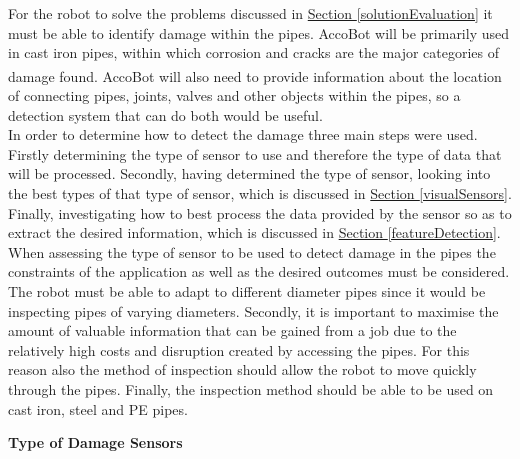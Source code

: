 \documentclass[11pt]{article}		%
\newcommand{\supercite}[1]{\textsuperscript{\cite{#1}}}		%
\newcommand{\sectref}[1]{\hyperref[#1]{Section \ref*{#1}}}     %
\begin{document}
	     For the robot to solve the problems discussed in \sectref{solutionEvaluation} it must be able to identify damage within the pipes.
	        AccoBot will be primarily used in cast iron pipes, within which corrosion and cracks are the major categories of damage found\supercite{Failure_pipes}\supercite{Failure_pipes2}.
	        AccoBot will also need to provide information about the location of connecting pipes, joints, valves and other objects within the pipes, so a detection system that can do both would be useful.
	        \\
            \hspace*{2ex}In order to determine how to detect the damage three main steps were used. 
	        Firstly determining the type of sensor to use and therefore the type of data that will be processed. 
	        Secondly, having determined the type of sensor, looking into the best types of that type of sensor, which is discussed in \sectref{visualSensors}.
	        Finally, investigating how to best process the data provided by the sensor so as to extract the desired information, which is discussed in \sectref{featureDetection}.
	       \\\hspace*{2ex}
	        When assessing the type of sensor to be used to detect damage in the pipes the constraints of the application as well as the desired outcomes must be considered.
            The robot must be able to adapt to different diameter pipes since it would be inspecting pipes of varying diameters.
	        Secondly, it is important to maximise the amount of valuable information that can be gained from a job due to the relatively high costs and disruption created by accessing the pipes.
	        For this reason also the method of inspection should allow the robot to move quickly through the pipes. 
	        Finally, the inspection method should be able to be used on cast iron, steel and PE pipes. 
	
	   \textbf{Type of Damage Sensors}\label{damagesensors}
	        
\end{document}
